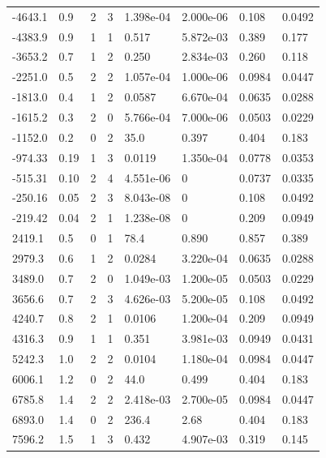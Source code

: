 \documentclass[preview]{standalone}
\begin{document}
{{\begin{tabular}{L{1.2cm}C{1.2cm} C{0.3cm}C{0.5cm} C{1.4cm}C{1.4cm} C{1.4cm}C{1.4cm}}
  -4643.1  &   0.9  & 2     &  3 &  1.398e-04  & 2.000e-06  & 0.108 &  0.0492   \\ 
  -4383.9  &   0.9  & 1     &  1 &  0.517  & 5.872e-03  & 0.389 &  0.177   \\ 
  -3653.2  &   0.7  & 1     &  2 &  0.250  & 2.834e-03  & 0.260 &  0.118   \\ 
  -2251.0  &   0.5  & 2     &  2 &  1.057e-04  & 1.000e-06  & 0.0984 &  0.0447   \\ 
  -1813.0  &   0.4  & 1     &  2 &  0.0587  & 6.670e-04  & 0.0635 &  0.0288   \\ 
  -1615.2  &   0.3  & 2     &  0 &  5.766e-04  & 7.000e-06  & 0.0503 &  0.0229   \\ 
  -1152.0  &   0.2  & 0     &  2 &  35.0  & 0.397  & 0.404 &  0.183   \\ 
  -974.33  &  0.19  & 1     &  3 &  0.0119  & 1.350e-04  & 0.0778 &  0.0353   \\ 
  -515.31  &  0.10  & 2     &  4 &  4.551e-06  & 0  & 0.0737 &  0.0335   \\ 
  -250.16  &  0.05  & 2     &  3 &  8.043e-08  & 0  & 0.108 &  0.0492   \\ 
  -219.42  &  0.04  & 2     &  1 &  1.238e-08  & 0  & 0.209 &  0.0949   \\ 
  2419.1  &   0.5  & 0     &  1 &  78.4  & 0.890  & 0.857 &  0.389   \\ 
  2979.3  &   0.6  & 1     &  2 &  0.0284  & 3.220e-04  & 0.0635 &  0.0288   \\ 
  3489.0  &   0.7  & 2     &  0 &  1.049e-03  & 1.200e-05  & 0.0503 &  0.0229   \\ 
  3656.6  &   0.7  & 2     &  3 &  4.626e-03  & 5.200e-05  & 0.108 &  0.0492   \\ 
  4240.7  &   0.8  & 2     &  1 &  0.0106  & 1.200e-04  & 0.209 &  0.0949   \\ 
  4316.3  &   0.9  & 1     &  1 &  0.351  & 3.981e-03  & 0.0949 &  0.0431   \\ 
  5242.3  &   1.0  & 2     &  2 &  0.0104  & 1.180e-04  & 0.0984 &  0.0447   \\ 
  6006.1  &   1.2  & 0     &  2 &  44.0  & 0.499  & 0.404 &  0.183   \\ 
  6785.8  &   1.4  & 2     &  2 &  2.418e-03  & 2.700e-05  & 0.0984 &  0.0447   \\ 
  6893.0  &   1.4  & 0     &  2 &  236.4  & 2.68  & 0.404 &  0.183   \\ 
  7596.2  &   1.5  & 1     &  3 &  0.432  & 4.907e-03  & 0.319 &  0.145   \\ 

\end{tabular}}}
\end{document}
